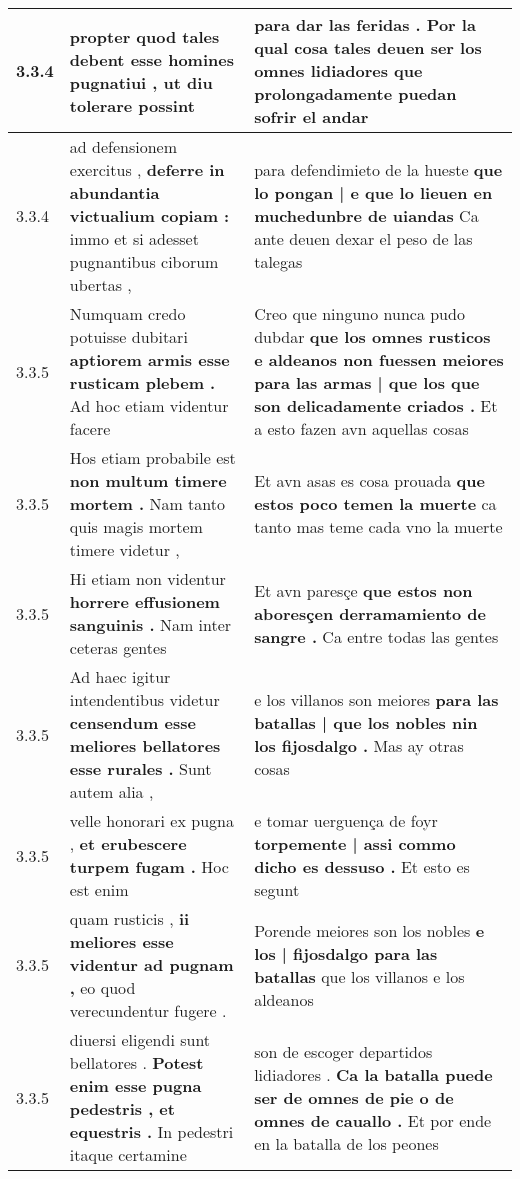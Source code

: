 \begin{tabular}{|p{1cm}|p{6.5cm}|p{6.5cm}|}
3.3.4 & propter quod tales debent \textbf{ esse homines pugnatiui , } ut diu tolerare possint & para dar las feridas . \textbf{ Por la qual cosa tales deuen ser los omnes lidiadores } que prolongadamente puedan sofrir el andar \\\hline
3.3.4 & ad defensionem exercitus , \textbf{ deferre in abundantia victualium copiam : } immo et si adesset pugnantibus ciborum ubertas , & para defendimieto de la hueste \textbf{ que lo pongan | e que lo lieuen en muchedunbre de uiandas } Ca ante deuen dexar el peso de las talegas \\\hline
3.3.5 & Numquam credo potuisse dubitari \textbf{ aptiorem armis esse rusticam plebem . } Ad hoc etiam videntur facere & Creo que ninguno nunca pudo dubdar \textbf{ que los omnes rusticos e aldeanos non fuessen meiores para las armas | que los que son delicadamente criados . } Et a esto fazen avn aquellas cosas \\\hline
3.3.5 & Hos etiam probabile est \textbf{ non multum timere mortem . } Nam tanto quis magis mortem timere videtur , & Et avn asas es cosa prouada \textbf{ que estos poco temen la muerte } ca tanto mas teme cada vno la muerte \\\hline
3.3.5 & Hi etiam non videntur \textbf{ horrere effusionem sanguinis . } Nam inter ceteras gentes & Et avn paresçe \textbf{ que estos non aboresçen derramamiento de sangre . } Ca entre todas las gentes \\\hline
3.3.5 & Ad haec igitur intendentibus videtur \textbf{ censendum esse meliores bellatores esse rurales . } Sunt autem alia , & e los villanos son meiores \textbf{ para las batallas | que los nobles nin los fijosdalgo . } Mas ay otras cosas \\\hline
3.3.5 & velle honorari ex pugna , \textbf{ et erubescere turpem fugam . } Hoc est enim & e tomar uerguença de foyr \textbf{ torpemente | assi commo dicho es dessuso . } Et esto es segunt \\\hline
3.3.5 & quam rusticis , \textbf{ ii meliores esse videntur ad pugnam , } eo quod verecundentur fugere . & Porende meiores son los nobles \textbf{ e los | fijosdalgo para las batallas } que los villanos e los aldeanos \\\hline
3.3.5 & diuersi eligendi sunt bellatores . \textbf{ Potest enim esse pugna pedestris , et equestris . } In pedestri itaque certamine & son de escoger departidos lidiadores . \textbf{ Ca la batalla puede ser de omnes de pie o de omnes de cauallo . } Et por ende en la batalla de los peones \\\hline

\end{tabular}
